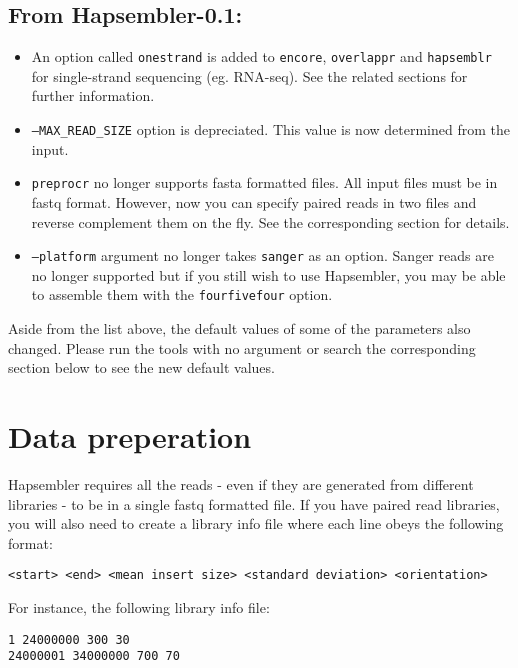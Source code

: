 \documentclass[12pt,a4paper]{report}
\begin{document}
\subsection{From Hapsembler-0.1:}

\begin{itemize}
\item An option called \texttt{onestrand} is added to \texttt{encore}, \texttt{overlappr} and \texttt{hapsemblr} for single-strand sequencing (eg. RNA-seq). See the related sections for further information. \\
\item \texttt{--MAX\_READ\_SIZE} option is depreciated. This value is now determined from the input. \\
\item \texttt{preprocr} no longer supports fasta formatted files. All input files must be in fastq format. However, now you can specify paired reads in two files and reverse complement them on the fly. See the corresponding section for details. \\
\item \texttt{--platform} argument no longer takes \texttt{sanger} as an option. Sanger reads are no longer supported but if you still wish to use Hapsembler, you may be able to assemble them with the \texttt{fourfivefour} option.
\end{itemize}

Aside from the list above, the default values of some of the parameters also changed. Please run the tools with no argument or search the corresponding section below to see the new default values.

\section{Data preperation}
\label{data}

Hapsembler requires all the reads - even if they are generated from different libraries - to be in a single fastq formatted file. If you have paired read libraries, you will also need to create a library info file where each line obeys the following format:

\begin{verbatim}
<start> <end> <mean insert size> <standard deviation> <orientation>
\end{verbatim}

For instance, the following library info file:

\begin{verbatim}
1 24000000 300 30
24000001 34000000 700 70
\end{verbatim}
\end{document}
